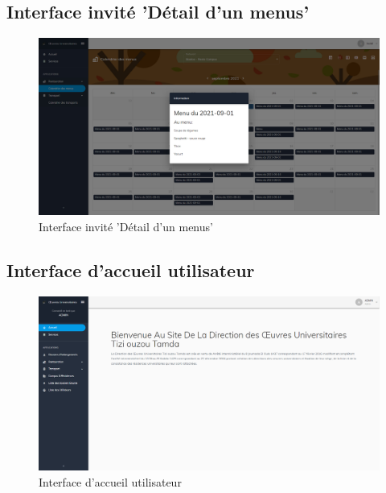     \subsection{Interface invité 'Détail d'un menus'}
    \begin{figure}[H]
        \centering
        \includegraphics[scale=0.21]{PFE Screens/Invité/Restauration/Calendrier des menus - Détail.jpg}
        \caption{Interface invité 'Détail d'un menus'}
    \end{figure}
    
    \subsection{Interface d'accueil utilisateur}
    \begin{figure}[H]
        \centering
        \includegraphics[scale=0.21]{PFE Screens/Admin/Accueil.jpg}
        \caption{Interface d'accueil utilisateur}
    \end{figure}

